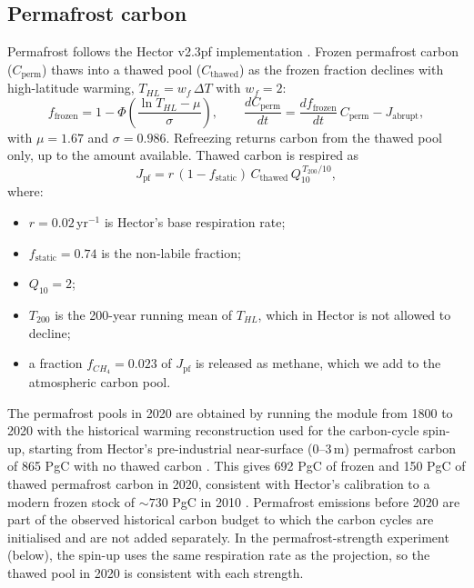 \subsection{Permafrost carbon}
Permafrost follows the Hector v2.3pf implementation \citep{woodardPermafrostImplementationSimple2021, linkHectorPermafrostImplementation2021}. Frozen permafrost carbon ($C_{\text{perm}}$) thaws into a thawed pool ($C_{\text{thawed}}$) as the frozen fraction declines with high-latitude warming, $T_{HL} = w_f\,\Delta T$ with $w_f = 2$:
\begin{equation}
f_{\text{frozen}} = 1 - \Phi\!\left(\frac{\ln T_{HL} - \mu}{\sigma}\right), \qquad
\frac{dC_{\text{perm}}}{dt} = \frac{d f_{\text{frozen}}}{dt}\, C_{\text{perm}} - J_{\text{abrupt}},
\label{eq:frozenfrac}
\end{equation}
with $\mu = 1.67$ and $\sigma = 0.986$. Refreezing returns carbon from the thawed pool only, up to the amount available. Thawed carbon is respired as
\begin{equation}
J_{\text{pf}} = r\,(1 - f_{\text{static}})\, C_{\text{thawed}}\, Q_{10}^{\,T_{200}/10},
\label{eq:pf_resp}
\end{equation}
where:
\begin{itemize}
\item $r = 0.02$\,yr$^{-1}$ is Hector's base respiration rate;
\item $f_{\text{static}} = 0.74$ is the non-labile fraction;
\item $Q_{10} = 2$;
\item $T_{200}$ is the 200-year running mean of $T_{HL}$, which in Hector is not allowed to decline;
\item a fraction $f_{CH_4} = 0.023$ of $J_{\text{pf}}$ is released as methane, which we add to the atmospheric carbon pool.
\end{itemize}
The permafrost pools in 2020 are obtained by running the module from 1800 to 2020 with the historical warming reconstruction used for the carbon-cycle spin-up, starting from Hector's pre-industrial near-surface (0--3\,m) permafrost carbon of 865 PgC with no thawed carbon \citep[Table~1]{woodardPermafrostImplementationSimple2021}. This gives 692 PgC of frozen and 150 PgC of thawed permafrost carbon in 2020, consistent with Hector's calibration to a modern frozen stock of ${\sim}730$ PgC in 2010 \citep[Table~2]{woodardPermafrostImplementationSimple2021}. Permafrost emissions before 2020 are part of the observed historical carbon budget to which the carbon cycles are initialised and are not added separately. In the permafrost-strength experiment (below), the spin-up uses the same respiration rate as the projection, so the thawed pool in 2020 is consistent with each strength.


